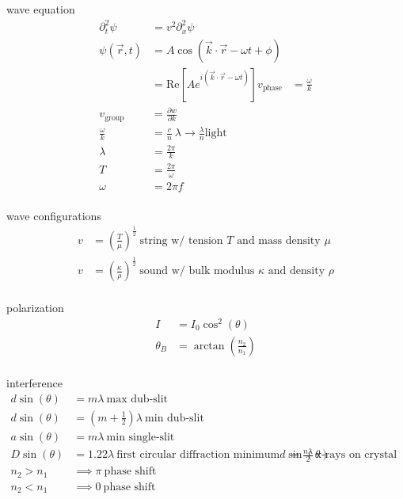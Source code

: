 \documentclass[avery5388, frame, grid]{flashcards}
\begin{document}
\begin{flashcard}{wave equation}
  {
    \begin{align*}
      \partial_{t}^{2} \psi &= v^{2} \partial_{x}^{2} \psi\\
      \psi(\vec{r}, t) &= A \cos(\vec{k} \cdot \vec{r} - \omega t + \phi)\\
      &= \textrm{Re}[A e^{i(\vec{k} \cdot \vec{r} - \omega t)}]
      v_{\textrm{phase}} &= \frac{\omega}{k}\\
      v_{\textrm{group}} &= \frac{\partial w}{\partial k}\\
      \frac{\omega}{k} &= \frac{c}{n} \ \lambda \rightarrow \frac{\lambda}{n} \textrm{light}\\
      \lambda &= \frac{2 \pi}{k}\\
      T &= \frac{2 \pi}{\omega}\\
      \omega &= 2 \pi f\\
    \end{align*}
  }
\end{flashcard}

\begin{flashcard}{wave configurations}
  {
    \begin{align*}
      v &= (\frac{T}{\mu})^{\frac{1}{2}} \ \textrm{string w/ tension $T$ and mass density $\mu$}\\
      v &= (\frac{\kappa}{\rho})^{\frac{1}{2}} \ \textrm{sound w/ bulk modulus $\kappa$ and density $\rho$}\\
    \end{align*}
  }
\end{flashcard}

\begin{flashcard}{polarization}
  {
    \begin{align*}
      I &= I_{0} \cos^{2}(\theta)\\
      \theta_{B} &= \arctan(\frac{n_{2}}{n_{1}})\\
    \end{align*}
  }
\end{flashcard}

\begin{flashcard}{interference}
  {
    \begin{align*}
      d \sin(\theta) &= m \lambda \ \textrm{max dub-slit}\\
      d \sin(\theta) &= (m + \frac{1}{2}) \lambda \ \textrm{min dub-slit}\\
      a \sin(\theta) &= m \lambda \ \textrm{min single-slit}\\
      D \sin(\theta) &= 1.22 \lambda \ \textrm{first circular diffraction minimum}
      d \sin(\theta) &= \frac{n \lambda}{2} \ \textrm{x-rays on crystal maxima}\\
      n_{2} > n_{1} &\implies \pi \ \textrm{phase shift}\\
      n_{2} < n_{1} &\implies 0 \ \textrm{phase shift}\\
    \end{align*}
  }
\end{flashcard}
\end{document}
